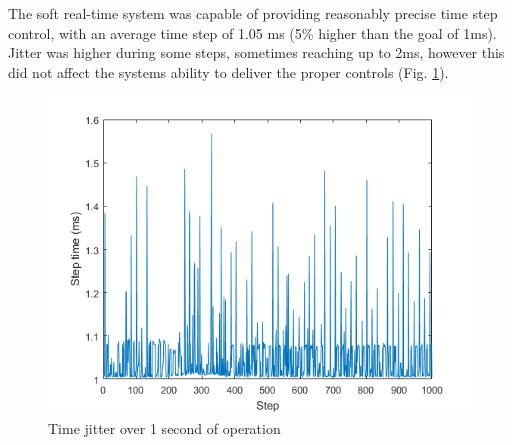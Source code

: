 \documentclass[12pt]{report}
\begin{document}
	  	The soft real-time system was capable of providing reasonably precise time step control, with an average time step of 1.05 ms (5\% higher than the goal of 1ms). Jitter was higher during some steps, sometimes reaching up to 2ms, however this did not affect the systems ability to deliver the proper controls (Fig. \ref{fig:jitter}). 


\begin{figure}[t] 
	\centering
	\includegraphics[width=0.9\linewidth]{time_jitter}
	\caption{Time jitter over 1 second of operation}
	\label{fig:jitter}
\end{figure}

	
\end{document}

